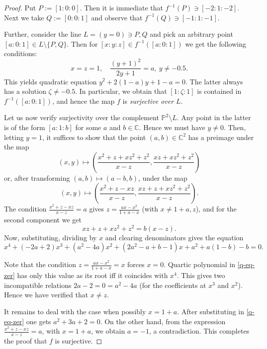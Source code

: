 \documentclass[14pt]{amsart}
\theoremstyle{definition}
\theoremstyle{remark}
\newcommand{\com}{\mathbb{C}}
\newcommand{\p}{\mathbb{P}}
\begin{document}
\begin{proof}
Put $P := [1:0:0]$. Then it is immediate that $f^{-1}(P) \ni
[-2:1:-2]$. Next we take $Q := [0:0:1]$ and observe that
$f^{-1}(Q) \ni [-1:1:-1]$.

Further, consider the line $L = (y = 0) \ni P,Q$ and pick an
arbitrary point $[a:0:1] \in L \setminus\{P,Q\}$. Then for
$[x:y:z] \in f^{-1}([a:0:1])$ we get the following conditions:
$$
x = z = 1,\quad \frac{(y + 1)^2}{2y + 1} = a,\ y \ne -0.5.
$$
This yields quadratic equation $y^2 + 2(1 - a)y + 1 - a = 0$. The
latter always has a solution $\zeta \ne -0.5$. In particular, we
obtain that $[1:\zeta:1]$ is contained in $f^{-1}([a:0:1])$, and
hence the map $f$ is \emph{surjective over $L$}.

Let us now verify surjectivity over the complement $\p^2 \setminus
L$. Any point in the latter is of the form $[a:1:b]$ for some $a$
and $b \in \com$. Hence we must have $y \ne 0$. Then, letting $y =
1$, it suffices to show that the point $(a,b) \in \com^2$ has a
preimage under the map
$$
(x,y) \mapsto (\frac{x^2 + z + xz^2 + z^2}{x - z}, \frac{xz + xz^2
+ z^2}{x - z})
$$
or, after transforming $(a,b) \mapsto (a - b, b)$, under the map
$$
(x,y) \mapsto (\frac{x^2 + z - xz}{x - z}, \frac{xz + z + xz^2 +
z^2}{x - z}).
$$
The condition $\displaystyle\frac{x^2 + z - xz}{x - z} = a$ gives
$z = \displaystyle\frac{ax - x^2}{1 + a - x}$ (with $x \ne 1 + a,
z$), and for the second component we get
$$
xz + z + xz^2 + z^2 = b(x - z).
$$
Now, substituting, dividing by $x$ and clearing denominators gives
the equation
\begin{equation}
\label{q-eq-zer} x^4 + (-2a + 2)x^3 + (a^2 - 4a)x^2 + (2a^2 - a +
b - 1)x + a^2 + a(1 - b) - b = 0.
\end{equation}

Note that the condition $z = \displaystyle\frac{ax - x^2}{1 + a -
x} = x$ forces $x = 0$. Quartic polynomial in \eqref{q-eq-zer} has
only this value as its root iff it coincides with $x^4$. This
gives two incompatible relations $2a - 2 = 0 = a^2 - 4a$ (for the
coefficients at $x^3$ and $x^2$). Hence we have verified that $x
\ne z$.

It remains to deal with the case when possibly $x = 1 + a$. After
substituting in \eqref{q-eq-zer} one gets $a^2 + 3a + 2 = 0$. On
the other hand, from the expression $\displaystyle\frac{x^2 + z -
xz}{x - z} = a$, with $x = 1 + a$, we obtain $a = -1$, a
contradiction. This completes the proof that $f$ is surjective.
\end{proof}
\end{document}
